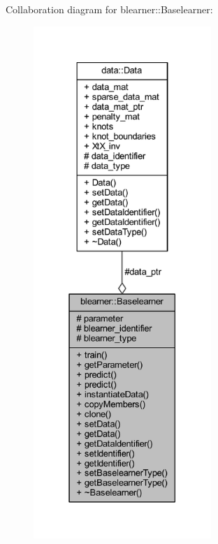 Collaboration diagram for blearner\+:\+:Baselearner\+:
\nopagebreak
\begin{figure}[H]
\begin{center}
\leavevmode
\includegraphics[height=550pt]{classblearner_1_1_baselearner__coll__graph}
\end{center}
\end{figure}
